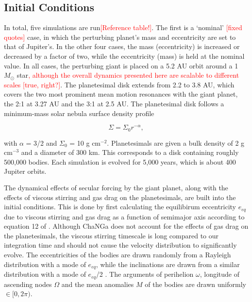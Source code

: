 \documentclass[twocolumn]{aastex63}
\newcommand{\ACBc}[1]{\textcolor{red}{#1}}
\begin{document}
\subsection{Initial Conditions}\label{sec:ics}

In total, five simulations are run\ACBc{[Reference table!]}. The first is a `nominal' \ACBc{[fixed quotes]} case, in which the perturbing planet's mass and eccentricity are set to that of Jupiter's. 
In the other four cases, the mass (eccentricity) is increased or decreased by a factor of two, while the eccentricity (mass) is held at the nominal 
value. In all cases, the perturbing giant is placed on a 5.2 AU orbit around a 1 $M_{\odot}$ star\ACBc{, although the overall dynamics presented here are scalable to different scales [true, right?]}. The planetesimal disk extends from 2.2 to 3.8 
AU, which covers the two most prominent mean motion resonances with the giant planet, the 2:1 at 3.27 AU and the 3:1 at 2.5 AU. The 
planetesimal disk follows a minimum-mass solar nebula surface density profile \citep{1981PThPS..70...35H}

\begin{equation}\label{eq:surf_den}
	\Sigma = \Sigma_{0} r^{-\alpha},
\end{equation}

\noindent with $\alpha$ = 3/2 and $\Sigma_{0}$ = 10 g cm$^{-2}$. Planetesimals are given a bulk density of 2 g cm$^{-3}$ and a diameter of 
300 km. This corresponds to a disk containing roughly 500,000 bodies. Each simulation is evolved for 5,000 years, which is about 400 Jupiter 
orbits.

The dynamical effects of secular forcing by the giant planet, along with  the effects of viscous stirring and gas drag on the planetesimals, are 
built into the initial conditions. This is done by first calculating the equilibirum eccentricity $e_{eq}$ due to viscous stirring and gas drag as a 
function of semimajor axis according to equation 12 of \citet{2002ApJ...581..666K}. Although {\sc ChaNGa} does not account for the effects of 
gas drag on the planetesimals, the viscous stirring timescale is long compared to our integration time and should not cause the velocity 
distribution to significantly evolve. The eccentricities of the bodies are drawn randomly from a Rayleigh distribution with a mode of $e_{eq}$, 
while the inclinations are drawn from a similar distribution with a mode of $e_{eq}$/2 \citep{1993MNRAS.263..875I}. The arguments of perihelion 
$\omega$, longitude of ascending nodes $\Omega$ and the mean anomalies $M$ of the bodies are drawn uniformly $\in [0, 2 \pi)$.
\end{document}
